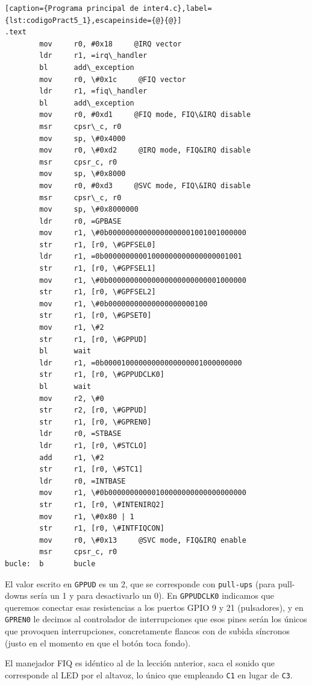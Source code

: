 \begin{lstlisting}[caption={Programa principal de inter4.c},label={lst:codigoPract5_1},escapeinside={@}{@}]
.text
        mov     r0, #0x18     @IRQ vector
        ldr     r1, =irq\_handler
        bl      add\_exception
        mov     r0, \#0x1c     @FIQ vector
        ldr     r1, =fiq\_handler
        bl      add\_exception
        mov     r0, #0xd1     @FIQ mode, FIQ\&IRQ disable
        msr     cpsr\_c, r0
        mov     sp, \#0x4000
        mov     r0, \#0xd2     @IRQ mode, FIQ&IRQ disable
        msr     cpsr_c, r0
        mov     sp, \#0x8000
        mov     r0, #0xd3     @SVC mode, FIQ\&IRQ disable
        msr     cpsr\_c, r0
        mov     sp, \#0x8000000
        ldr     r0, =GPBASE
        mov     r1, \#0b00000000000000000001001001000000
        str     r1, [r0, \#GPFSEL0]
        ldr     r1, =0b00000000001000000000000000001001
        str     r1, [r0, \#GPFSEL1]
        mov     r1, \#0b00000000000000000000000001000000
        str     r1, [r0, \#GPFSEL2]
        mov     r1, \#0b00000000000000000000100
        str     r1, [r0, \#GPSET0]
        mov     r1, \#2
        str     r1, [r0, \#GPPUD]
        bl      wait
        ldr     r1, =0b00001000000000000000001000000000
        str     r1, [r0, \#GPPUDCLK0]
        bl      wait
        mov     r2, \#0
        str     r2, [r0, \#GPPUD]
        str     r1, [r0, \#GPREN0]
        ldr     r0, =STBASE
        ldr     r1, [r0, \#STCLO]
        add     r1, \#2
        str     r1, [r0, \#STC1]
        ldr     r0, =INTBASE
        mov     r1, \#0b00000000000100000000000000000000
        str     r1, [r0, \#INTENIRQ2]
        mov     r1, \#0x80 | 1
        str     r1, [r0, \#INTFIQCON]
        mov     r0, \#0x13     @SVC mode, FIQ&IRQ enable
        msr     cpsr_c, r0
bucle:  b       bucle
\end{lstlisting}

El valor escrito en {\tt GPPUD} es un 2, que se corresponde con {\tt pull-ups} (para pull-downs
sería un 1 y para desactivarlo un 0). En {\tt GPPUDCLK0} indicamos que queremos conectar esas
resistencias a los puertos GPIO 9 y 21 (pulsadores), y en {\tt GPREN0} le decimos al controlador
de interrupciones que esos pines serán los únicos que provoquen interrupciones, concretamente
flancos con de subida síncronos (justo en el momento en que el botón toca fondo).

El manejador FIQ es idéntico al de la lección anterior, saca el sonido que corresponde al LED
por el altavoz, lo único que empleando {\tt C1} en lugar de {\tt C3}.

